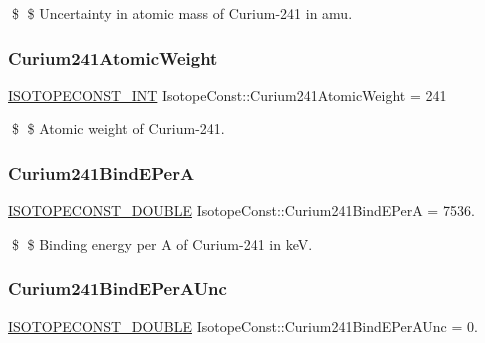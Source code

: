 \$ \$ Uncertainty in atomic mass of Curium-\/241 in amu. \mbox{\label{group___isotope_const-_curium-_cm241_gad0bbeb3d22854b5e82982a62d948f71d}} 
\subsubsection{\texorpdfstring{Curium241\+Atomic\+Weight}{Curium241AtomicWeight}}
{\footnotesize\ttfamily \mbox{\hyperlink{group___isotope_const-_macros_ga5f18360b3e99483a35c32d789e62621c}{I\+S\+O\+T\+O\+P\+E\+C\+O\+N\+S\+T\+\_\+\+I\+NT}} Isotope\+Const\+::\+Curium241\+Atomic\+Weight = 241}

\$ \$ Atomic weight of Curium-\/241. \mbox{\label{group___isotope_const-_curium-_cm241_ga8afba82ea760bb2797b6a8f96f14b071}} 
\subsubsection{\texorpdfstring{Curium241\+Bind\+E\+PerA}{Curium241BindEPerA}}
{\footnotesize\ttfamily \mbox{\hyperlink{group___isotope_const-_macros_ga8f45a7272ce02c0b4c65c44636ed719a}{I\+S\+O\+T\+O\+P\+E\+C\+O\+N\+S\+T\+\_\+\+D\+O\+U\+B\+LE}} Isotope\+Const\+::\+Curium241\+Bind\+E\+PerA = 7536.}

\$ \$ Binding energy per A of Curium-\/241 in keV. \mbox{\label{group___isotope_const-_curium-_cm241_gaec421d7c001fb118d0214f36f9305e51}} 
\subsubsection{\texorpdfstring{Curium241\+Bind\+E\+Per\+A\+Unc}{Curium241BindEPerAUnc}}
{\footnotesize\ttfamily \mbox{\hyperlink{group___isotope_const-_macros_ga8f45a7272ce02c0b4c65c44636ed719a}{I\+S\+O\+T\+O\+P\+E\+C\+O\+N\+S\+T\+\_\+\+D\+O\+U\+B\+LE}} Isotope\+Const\+::\+Curium241\+Bind\+E\+Per\+A\+Unc = 0.}

